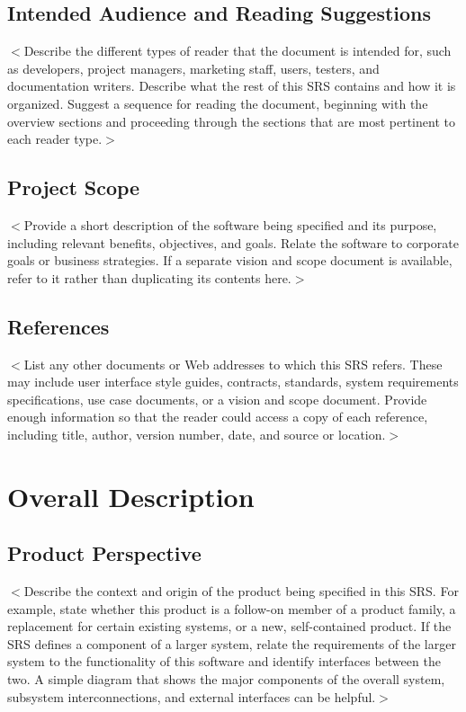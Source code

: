 \documentclass[a4paper, 11pt]{scrreprt}
\begin{document}
\section{Intended Audience and Reading Suggestions}
$<$Describe the different types of reader that the document is intended for, 
such as developers, project managers, marketing staff, users, testers, and 
documentation writers. Describe what the rest of this SRS contains and how it is 
organized. Suggest a sequence for reading the document, beginning with the 
overview sections and proceeding through the sections that are most pertinent to 
each reader type.$>$

\section{Project Scope}
$<$Provide a short description of the software being specified and its purpose, 
including relevant benefits, objectives, and goals. Relate the software to 
corporate goals or business strategies. If a separate vision and scope document 
is available, refer to it rather than duplicating its contents here.$>$

\section{References}
$<$List any other documents or Web addresses to which this SRS refers. These may 
include user interface style guides, contracts, standards, system requirements 
specifications, use case documents, or a vision and scope document. Provide 
enough information so that the reader could access a copy of each reference, 
including title, author, version number, date, and source or location.$>$


\chapter{Overall Description}

\section{Product Perspective}
$<$Describe the context and origin of the product being specified in this SRS.  
For example, state whether this product is a follow-on member of a product 
family, a replacement for certain existing systems, or a new, self-contained 
product. If the SRS defines a component of a larger system, relate the 
requirements of the larger system to the functionality of this software and 
identify interfaces between the two. A simple diagram that shows the major 
components of the overall system, subsystem interconnections, and external 
interfaces can be helpful.$>$
\end{document}
